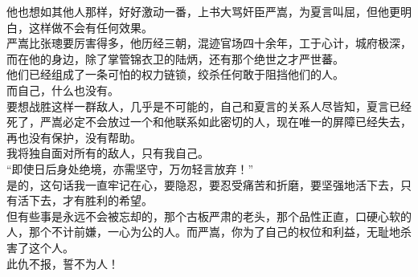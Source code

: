 \begin{multicols}{\theparacolNo}
他也想如其他人那样，好好激动一番，上书大骂奸臣严嵩，为夏言叫屈，但他更明白，这样做不会有任何效果。\\

严嵩比张璁要厉害得多，他历经三朝，混迹官场四十余年，工于心计，城府极深，而在他的身边，除了掌管锦衣卫的陆炳，还有那个绝世之才严世蕃。\\

他们已经组成了一条可怕的权力链锁，绞杀任何敢于阻挡他们的人。\\

而自己，什么也没有。\\

要想战胜这样一群敌人，几乎是不可能的，自己和夏言的关系人尽皆知，夏言已经死了，严嵩必定不会放过一个和他联系如此密切的人，现在唯一的屏障已经失去，再也没有保护，没有帮助。\\

我将独自面对所有的敌人，只有我自己。\\

“即使日后身处绝境，亦需坚守，万勿轻言放弃！”\\

是的，这句话我一直牢记在心，要隐忍，要忍受痛苦和折磨，要坚强地活下去，只有活下去，才有胜利的希望。\\

但有些事是永远不会被忘却的，那个古板严肃的老头，那个品性正直，口硬心软的人，那个不计前嫌，一心为公的人。而严嵩，你为了自己的权位和利益，无耻地杀害了这个人。\\

此仇不报，誓不为人！\\
\ifnum{}
	\end{multicols}
\fi
\newpage
